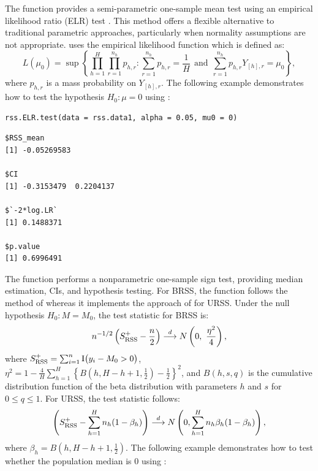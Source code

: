 The  function provides a semi-parametric one-sample mean test using an empirical likelihood ratio (ELR) test \citep{Ahn:2024}. This method offers a flexible alternative to traditional parametric approaches, particularly when normality assumptions are not appropriate.  uses the empirical likelihood function which is defined as:
\begin{equation}\nonumber
L(\mu_0)=\sup \left\{\prod_{h=1}^H\prod_{r=1}^{n_h}  p_{h,r}: \sum_{r=1}^{n_h} p_{h,r}=\frac{1}{H} ~~\mbox{and}~~ \sum_{r=1}^{n_h} p_{h,r} Y_{[h],r}=\mu_0 \right\},
\end{equation} 
where $p_{h,r}$ is a mass probability on $Y_{[h],r}$. 
The following example demonstrates how to test the hypothesis $H_0: \mu=0$ using :
%
\begin{verbatim}
rss.ELR.test(data = rss.data1, alpha = 0.05, mu0 = 0)
\end{verbatim}
\begin{verbatim}
$RSS_mean
[1] -0.05269583

$CI
[1] -0.3153479  0.2204137

$`-2*log.LR`
[1] 0.1488371

$p.value
[1] 0.6996491
\end{verbatim}
% 

The  function performs a nonparametric one-sample sign test, providing median estimation, CIs, and hypothesis testing. For BRSS, the function follows the method of \cite{hettmansperger1995ranked} whereas it implements the approach of \cite{Barabesi:2001} for URSS. Under the null hypothesis $H_0:M=M_0$, the test statistic for BRSS is:
\begin{equation} \nonumber 
n^{-1/2}\left(S_{{\rm RSS}}^{+}-\frac{n}{2}\right)
 \overset{d}{\longrightarrow}N\left(0,~\frac{\eta^{2}}{4}\right),
\end{equation} 
where $S_{{\rm RSS}}^{+}=\sum_{i=1}^{n}{\rm I}\big( y_{i}-M_{0}>0\big)$, $\eta^{2}=1-\frac{4}{H}\sum_{h=1}^{H}\left\{ B\left(h,H-h+1,\frac{1}{2}\right)-\frac{1}{2}\right\} ^{2}$, and $B(h,s,q)$ is the cumulative distribution function of the beta distribution with parameters $h$ and $s$ for $0 \le q \le 1$. For URSS, the test statistic follows:
\begin{equation} \nonumber
\left(S_{{\rm RSS}}^{+}- \sum_{h=1}^H n_h (1-\beta_h) \right)
 \overset{d}{\longrightarrow}N\left(0,\sum_{h=1}^H n_h \beta_h (1-\beta_h)\right),
\end{equation}
where $\beta_h= B\left(h, H-h+1,\frac{1}{2}\right)$.  The following example demonstrates how to test whether the population median is 0 using :
%


